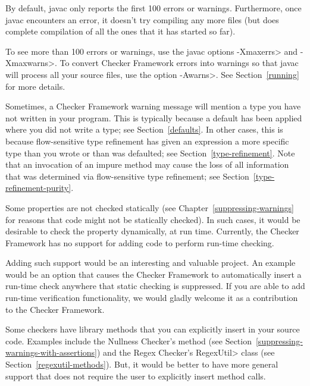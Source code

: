 By default, javac only reports the first 100 errors or warnings.
Furthermore, once javac encounters an error, it doesn't try compiling any
more files (but does complete compilation of all the ones that it has
started so far).

To see more than 100 errors or warnings, use the javac options \<-Xmaxerrs>
and \<-Xmaxwarns>.  To convert Checker Framework errors into warnings so
that javac will process all your source files, use the option \<-Awarns>.
See Section~\ref{running} for more details.



Sometimes, a Checker Framework warning message will mention a type you have
not written in your program.  This is typically because a default has been
applied where you did not write a type; see Section~\ref{defaults}.  In
other cases, this is because flow-sensitive type refinement has given an
expression a more specific type than you wrote or than was defaulted; see
Section~\ref{type-refinement}.
Note that an invocation of an impure method may cause the loss of all
information that was determined via flow-sensitive type refinement; see
Section~\ref{type-refinement-purity}.



Some properties are not checked statically (see
Chapter~\ref{suppressing-warnings} for reasons that code might not be
statically checked).  In such cases, it would be desirable to check the
property dynamically, at run time.
Currently, the Checker Framework has no support for adding code to perform
run-time checking.

Adding such support would be an interesting and valuable project.
An example would be an option that causes the Checker Framework to
automatically insert a run-time check anywhere that static checking is
suppressed.
If you
are able to add run-time verification functionality, we would gladly
welcome it as a contribution to the Checker Framework.

Some checkers have library methods that you can explicitly insert in your
source code.
Examples include the Nullness Checker's
 method (see
Section~\ref{suppressing-warnings-with-assertions}) and the Regex Checker's
\<RegexUtil> class (see Section~\ref{regexutil-methods}).
But, it would be better to have more general support that does not require
the user to explicitly insert method calls.



